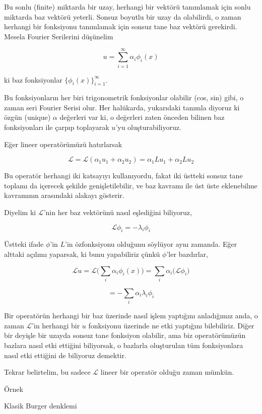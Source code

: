 \documentclass[12pt,fleqn]{article}\usepackage{../../common}
\begin{document}
Bu sonlu (finite) miktarda bir uzay, herhangi bir vektörü tanımlamak için
sonlu miktarda baz vektörü yeterli. Sonsuz boyutlu bir uzay da olabilirdi,
o zaman herhangi bir fonksiyonu tanımlamak için sonsuz tane baz vektörü
gerekirdi. Mesela Fourier Serilerini düşünelim

$$ u = \sum_{i=1}^{\infty} \alpha_i \phi_i(x) $$

ki baz fonksiyonlar $\bigg\{ \phi_i(x)  \bigg\}_{i=1}^\infty$.

Bu fonksiyonların her biri trigonometrik fonksiyonlar olabilir (cos, sin)
gibi, o zaman seri Fourier Serisi olur. Her halükarda, yukarıdaki tanımla
diyoruz ki özgün (unique) $\alpha$ değerleri var ki, o değerleri zaten
önceden bilinen baz fonksiyonları ile çarpıp toplayarak $u$'yu
oluşturabiliyoruz.

Eğer lineer operatörümüzü hatırlarsak

$$ \mathcal{L} = \mathcal{L}(\alpha_1 u_1 + \alpha_2 u_2) = 
\alpha_1 Lu_1 + \alpha_2 Lu_2 $$

Bu operatör herhangi iki katsayıyı kullanıyordu, fakat iki üstteki sonsuz
tane toplamı da içerecek şekilde genişletilebilir, ve baz kavramı ile üst
üste eklenebilme kavramının arasındaki alakayı gösterir. 

Diyelim ki $\mathcal{L}$'nin her baz vektörünü nasıl eşlediğini biliyoruz, 

$$ \mathcal{L} \phi_i = -\lambda_i \phi_i $$

Üstteki ifade $\phi$'in $L$'in özfonksiyonu olduğunu söylüyor aynı
zamanda. Eğer alttaki açılımı yaparsak, ki bunu yapabiliriz çünkü
$\phi$'ler bazdırlar, 

$$ \mathcal{L}u = \mathcal{L} \bigg( \sum_i \alpha_i \phi_i(x) \bigg) =
\sum_i \alpha_i \bigg( \mathcal{L} \phi_i \bigg)
 $$

$$ = -\sum_i \alpha_i \lambda_i \phi_i  $$

Bir operatörün herhangi bir baz üzerinde nasıl işlem yaptığını anladığımız
anda, o zaman $\mathcal{L}$'in herhangi bir $u$ fonksiyonu üzerinde ne etki yaptığını
bilebiliriz. Diğer bir deyişle bir uzayda sonsuz tane fonksiyon olabilir,
ama biz operatörümüzün bazlara nasıl etki ettiğini biliyorsak, o bazlarla
oluşturulan tüm fonksiyonlara nasıl etki ettiğini de biliyoruz demektir. 

Tekrar belirtelim, bu sadece $\mathcal{L}$ lineer bir operatör olduğu zaman mümkün. 

Örnek

Klasik Burger denklemi
\end{document}
